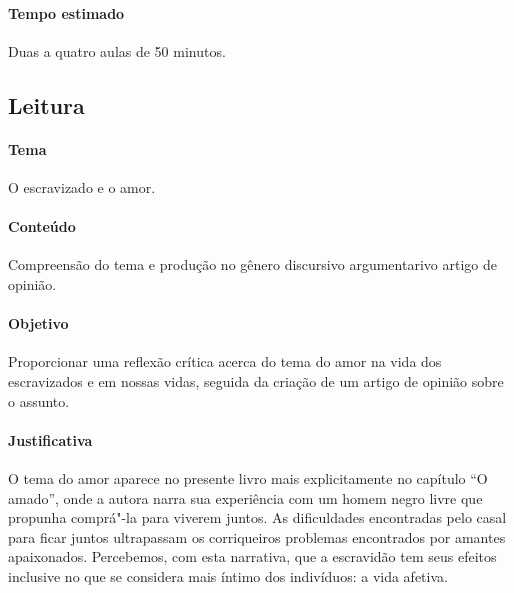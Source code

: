 \documentclass[11pt]{extarticle}
\begin{document}
 \paragraph{Tempo estimado} Duas a quatro aulas de 50 minutos.


\subsection{Leitura}

 \paragraph{Tema} O escravizado e o amor.

 \paragraph{Conteúdo} Compreensão do tema e produção no gênero discursivo 
 argumentarivo artigo de opinião.

 \paragraph{Objetivo} Proporcionar uma reflexão crítica acerca do tema do amor
 na vida dos escravizados e em nossas vidas, seguida da criação de um artigo de opinião
 sobre o assunto.

 \paragraph{Justificativa} O tema do amor aparece no presente livro mais explicitamente
 no capítulo ``O amado'', onde a autora narra sua experiência com um 
 homem negro livre que propunha comprá"-la para viverem juntos. As dificuldades 
 encontradas pelo casal para ficar juntos ultrapassam os corriqueiros problemas
 encontrados por amantes apaixonados. Percebemos, com esta narrativa, que a escravidão
 tem seus efeitos inclusive no que se considera mais íntimo dos indivíduos: a vida
 afetiva.
\end{document}
